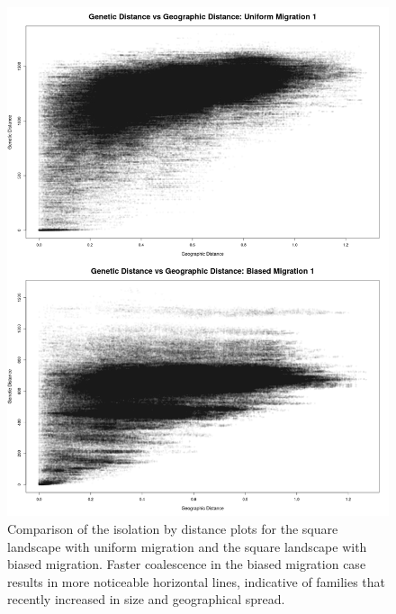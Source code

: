 \documentclass{article}
\begin{document}

\begin{figure}
\centering
 \includegraphics[scale=.35]{figs/ibd_comp}
\caption{Comparison of the isolation by distance plots for the square landscape with uniform migration
and the square landscape with biased migration.
Faster coalescence in the biased migration case results in more noticeable horizontal lines,
indicative of families that recently increased in size and geographical spread.}
\label{fig:ibd_comp}
\end{figure}
\end{document}
